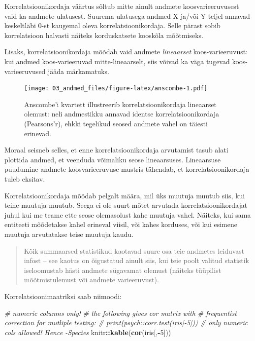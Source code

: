 \documentclass[]{book}
\newenvironment{Shaded}{\begin{snugshade}}{\end{snugshade}}
\newcommand{\CommentTok}[1]{\textcolor[rgb]{0.56,0.35,0.01}{\textit{#1}}}
\newcommand{\DecValTok}[1]{\textcolor[rgb]{0.00,0.00,0.81}{#1}}
\newcommand{\KeywordTok}[1]{\textcolor[rgb]{0.13,0.29,0.53}{\textbf{#1}}}
\newcommand{\NormalTok}[1]{#1}
\newcommand{\OperatorTok}[1]{\textcolor[rgb]{0.81,0.36,0.00}{\textbf{#1}}}
\begin{document}
Korrelatsioonikordaja väärtus sõltub mitte ainult andmete koosvarieeruvusest vaid ka andmete ulatusest.
Suurema ulatusega andmed X ja/või Y teljel annavad keskeltläbi 0-st kaugemal oleva korrelatsioonikordaja.
Selle pärast sobib korrelatsioon halvasti näiteks korduskatsete kooskõla mõõtmiseks.

Lisaks, korrelatsioonikordaja mõõdab vaid andmete \emph{lineaarset} koos-varieeruvust: kui andmed koos-varieeruvad mitte-lineaarselt, siis võivad ka väga tugevad koos-varieeruvused jääda märkamatuks.



\begin{figure}
\centering
\texttt{[image: 03\_andmed\_files/figure-latex/anscombe-1.pdf]}
\caption{\label{fig:anscombe}Anscombe'i kvartett illustreerib korrelatsioonikordaja lineaarset olemust: neli andmestikku annavad identse korrelatsioonikordaja (Pearsons'r), ehkki tegelikud seosed andmete vahel on täiesti erinevad.}
\end{figure}

Moraal seisneb selles, et enne korrelatsioonikordaja arvutamist tasub alati plottida andmed, et veenduda võimaliku seose lineaarsuses.
Lineaarsuse puudumine andmete koosvarieeruvuse mustris tähendab, et korrelatsioonikordaja tuleb eksitav.

Korrelatsioonikordaja mõõdab pelgalt määra, mil üks muutuja muutub siis, kui teine muutuja muutub.
Seega ei ole suurt mõtet arvutada korrelatsioonikordajat juhul kui me teame ette seose olemasolust kahe muutuja vahel.
Näiteks, kui sama entiteeti mõõdetakse kahel erineval viisil, või kahes korduses, või kui esimene muutuja arvutatakse teise muutuja kaudu.

\begin{quote}
Kõik summaarsed statistikud kaotavad suure osa teie andmetes leiduvast infost -- see kaotus on õigustatud ainult siis, kui teie poolt valitud statistik iseloomustab hästi andmete sügavamat olemust (näiteks tüüpilist mõõtmistulemust või andmete varieeruvust).
\end{quote}

Korrelatsioonimaatriksi saab niimoodi:

\begin{Shaded}
\begin{Highlighting}[]
\CommentTok{# numeric columns only!}
\CommentTok{# the following gives cor matrix with }
\CommentTok{# frequentist correction for mutliple testing:}
\CommentTok{# print(psych::corr.test(iris[-5]))}
\CommentTok{# only numeric cols allowed! Hence -Species}
\NormalTok{knitr}\OperatorTok{::}\KeywordTok{kable}\NormalTok{(}\KeywordTok{cor}\NormalTok{(iris[,}\OperatorTok{-}\DecValTok{5}\NormalTok{]))}
\end{Highlighting}
\end{Shaded}
\end{document}
